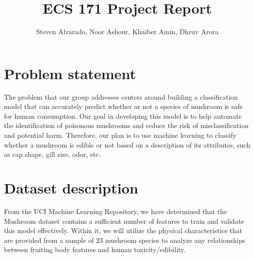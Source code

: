 \documentclass[twocolumn, 11pt]{article} \linespread{1}
\title{\textbf{ECS 171} Project Report}
\author{Steven Alvarado, Noor Ashour, Khaiber Amin, Dhruv Arora}
\date{}
\begin{document}
\maketitle



\section*{Problem statement}
    The problem that our group addresses centers around building a classification model that can accurately predict whether or not a species of mushroom is safe for human consumption. Our goal in developing this model is to help automate the identification of poisonous mushrooms and reduce the risk of misclassification and potential harm. Therefore, our plan is to use machine learning to classify whether a mushroom is edible or not based on a description of its attributes, such as cap shape, gill size, odor, etc.

\section*{Dataset description}
    From the UCI Machine Learning Repository, we have determined that the Mushroom dataset contains a sufficient number of features to train and validate this model effectively. Within it, we will utilize the physical characteristics that are provided from a sample of 23 mushroom species to analyze any relationships between fruiting body features and human toxicity/edibility. 
\end{document}
